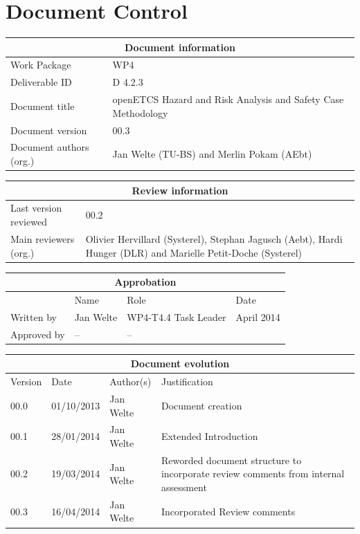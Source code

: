 \documentclass{template/openetcs_report}
\begin{document}
\maketitle
\tableofcontents
\listoffiguresandtables
\newpage

\chapter{Document Control}

\begin{tabular}{|p{4.4cm}|p{8.7cm}|}
\hline
\multicolumn{2}{|c|}{Document information} \\
\hline
Work Package &  WP4  \\
Deliverable ID & D 4.2.3\\
\hline
Document title & openETCS Hazard and Risk Analysis and Safety Case Methodology \\
Document version & 00.3 \\
Document authors (org.)  & Jan Welte (TU-BS) and Merlin Pokam (AEbt)\\
\hline
\end{tabular}

\begin{tabular}{|p{4.4cm}|p{8.7cm}|}
\hline
\multicolumn{2}{|c|}{Review information} \\
\hline
Last version reviewed & 00.2 \\
\hline
Main reviewers (org.) & Olivier Hervillard	(Systerel), Stephan Jagusch (Aebt), Hardi Hunger (DLR) and Marielle Petit-Doche (Systerel) \\
\hline
\end{tabular}

\begin{tabular}{|p{2.2cm}|p{4cm}|p{4cm}|p{2cm}|}
\hline
\multicolumn{4}{|c|}{Approbation} \\
\hline
  &  Name & Role & Date   \\
\hline  
Written by    &  Jan Welte & WP4-T4.4 Task Leader  &  April 2014\\
\hline
Approved by & -- & -- & \\
\hline
\end{tabular}

\begin{tabular}{|p{2.2cm}|p{2cm}|p{3cm}|p{5cm}|}
\hline
\multicolumn{4}{|c|}{Document evolution} \\
\hline
Version &  Date & Author(s) & Justification  \\
\hline
00.0 & 01/10/2013 & Jan Welte &  Document creation \\
\hline  
00.1 & 28/01/2014 & Jan Welte &  Extended Introduction  \\
00.2 & 19/03/2014 & Jan Welte &  Reworded document structure to incorporate review comments from internal assessment \\
00.3 & 16/04/2014 & Jan Welte &  Incorporated Review comments \\
\hline  
\end{tabular}
\newpage
\end{document}
